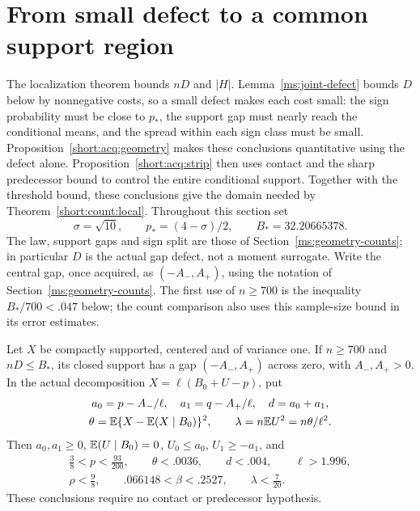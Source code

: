 \section{From small defect to a common support region}\label{short:acq:section}

The localization theorem bounds $nD$ and $|H|$.
Lemma~\ref{ms:joint-defect}
bounds $D$ below by nonnegative costs, so a small defect makes each
cost small: the sign probability must be close to $p_*$, the support
gap must nearly reach the conditional means, and the spread within each
sign class must be small. Proposition~\ref{short:acq:geometry} makes
these conclusions quantitative using the defect alone.
Proposition~\ref{short:acq:strip} then uses contact and the sharp
predecessor bound to control the entire conditional support. Together
with the threshold bound, these conclusions give the domain needed by
Theorem~\ref{short:count:local}.
Throughout this section set
\[
 \sigma=\sqrt{10},\qquad p_*=(4-\sigma)/2,\qquad
 B_*=32.20665378.
\]
The law, support gaps and sign split are those of
Section~\ref{ms:geometry-counts}; in particular $D$ is the actual gap
defect, not a moment surrogate. Write the central gap, once acquired, as
$(-A_-,A_+)$, using the notation of
Section~\ref{ms:geometry-counts}. The first use of $n\ge700$ is the
inequality $B_*/700<.047$ below; the count comparison also uses this
sample-size bound in its error estimates.

\begin{proposition}\label{short:acq:geometry}
Let $X$ be compactly supported, centered and of variance one. If
$n\ge700$ and $nD\le B_*$, its closed support has a gap
$(-A_-,A_+)$ across zero, with $A_-,A_+>0$. In the actual decomposition
$X=\ell(B_0+U-p)$, put
\[
 \begin{gathered}
a_0=p-A_-/\ell,\quad a_1=q-A_+/\ell,\quad d=a_0+a_1,\\
\theta=\mathbb E\{X-\mathbb E(X\mid B_0)\}^2,\qquad
\lambda=n\mathbb E U^2=n\theta/\ell^2.
\end{gathered}
\]
Then $a_0,a_1\ge0$, $\mathbb E(U\mid B_0)=0$, $U_0\le a_0$,
$U_1\ge-a_1$, and
\begin{gather}
 \frac38<p<\frac{93}{200},\qquad
 \theta<.0036,\qquad d<.004,\qquad\ell>1.996,
 \label{short:acq:domain}\\
 \rho<\frac98,\qquad .066148<\beta<.2527,
 \qquad\lambda<\frac7{20}.\label{short:acq:outputs}
\end{gather}
These conclusions require no contact or predecessor hypothesis.
\end{proposition}

